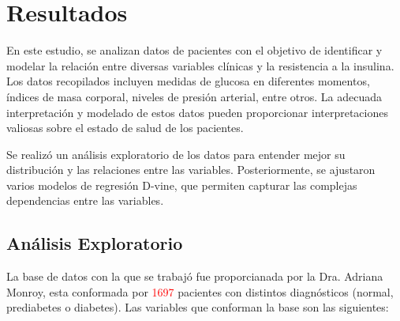 \chapter{Resultados}\label{Resultados}

En este estudio, se analizan datos de pacientes con el objetivo de identificar y modelar la relación entre diversas variables clínicas y la resistencia a la insulina. Los datos recopilados incluyen medidas de glucosa en diferentes momentos, índices de masa corporal, niveles de presión arterial, entre otros. La adecuada interpretación y modelado de estos datos pueden proporcionar interpretaciones valiosas sobre el estado de salud de los pacientes. 

Se realizó un análisis exploratorio de los datos para entender mejor su distribución y las relaciones entre las variables. Posteriormente, se ajustaron varios modelos de regresión D-vine, que permiten capturar las complejas dependencias entre las variables. 

\section{Análisis Exploratorio}

La base de datos con la que se trabajó fue proporcianada por la Dra. Adriana Monroy, esta conformada por \textcolor{red}{1697} pacientes con distintos diagnósticos (normal, prediabetes o diabetes). Las variables que conforman la base son las siguientes:

